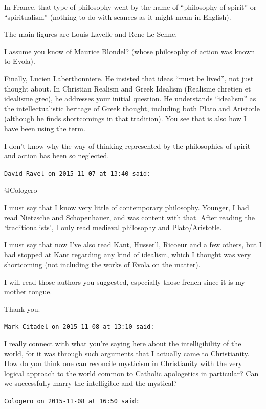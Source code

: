 \begin{footnotesize}
\begin{sffamily}
In France, that type of philosophy went by the name of “philosophy of spirit” or “spiritualism” (nothing to do with
seances as it might mean in English).

The main figures are Louis Lavelle and Rene Le Senne.

I assume you know of Maurice Blondel? (whose philosophy of action was known to Evola).

Finally, Lucien Laberthonniere. He insisted that ideas “must be lived”, not just thought about. In Christian Realism and
Greek Idealism (Realisme chretien et idealisme grec), he addresses your initial question. He understands “idealism” as
the intellectualistic heritage of Greek thought, including both Plato and Aristotle (although he finds shortcomings in
that tradition). You see that is also how I have been using the term.

I don't know why the way of thinking represented by the philosophies of spirit and action has been so
neglected.


\hfill

\texttt{David Ravel on 2015-11-07 at 13:40 said: }

@Cologero

I must say that I know very little of contemporary philosophy. Younger, I had read Nietzsche and Schopenhauer, and was
content with that. After reading the ‘traditionalists’, I only read medieval philosophy and
Plato/Aristotle. 

I must say that now I've also read Kant, Husserll, Ricoeur and a few others, but I had stopped at Kant
regarding any kind of idealism, which I thought was very shortcoming (not including the works of Evola on the matter). 

I will read those authors you suggested, especially those french since it is my mother tongue. 

Thank you.


\hfill

\texttt{Mark Citadel on 2015-11-08 at 13:10 said: }

I really connect with what you're saying here about the intelligibility of the world, for it was through
such arguments that I actually came to Christianity. How do you think one can reconcile mysticism in Christianity with
the very logical approach to the world common to Catholic apologetics in particular? Can we successfully marry the
intelligible and the mystical?


\hfill

\texttt{Cologero on 2015-11-08 at 16:50 said: }


\end{sffamily}
\end{footnotesize}

